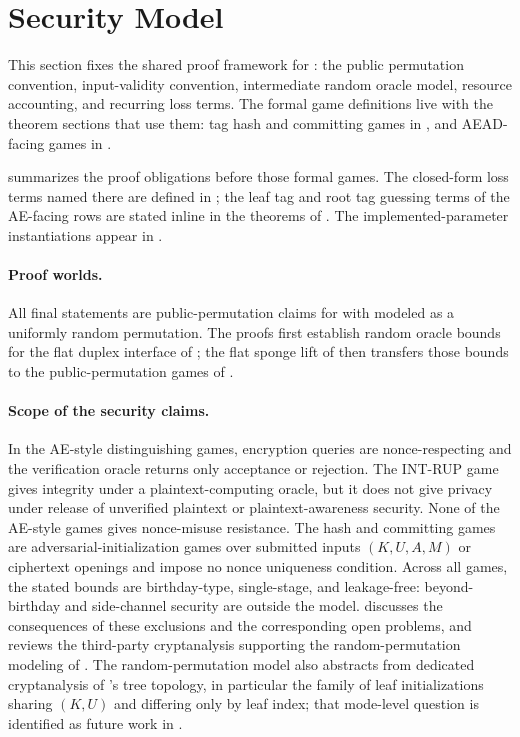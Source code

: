 \section{Security Model}
\label{sec:security-model}

This section fixes the shared proof framework for \TW{}: the public permutation
convention, input-validity convention, intermediate random oracle model,
resource accounting, and recurring loss terms. The formal game definitions live
with the theorem sections that use them: tag hash and committing games in
, and AEAD-facing games in
.

 summarizes the proof obligations before those
formal games. The closed-form loss terms named there are defined in
; the leaf tag and root tag guessing terms of the
AE-facing rows are stated inline in the theorems of .
The implemented-parameter instantiations appear in
.

\paragraph{Proof worlds.}
All final statements are public-permutation claims for \TW{} with \Keccakp{}
modeled as a uniformly random permutation. The proofs first establish random
oracle bounds for the flat duplex interface of ; the flat
sponge lift of  then transfers those bounds to the
public-permutation games of
.

\paragraph{Scope of the security claims.}
In the AE-style distinguishing games, encryption queries are nonce-respecting
and the verification oracle returns only acceptance or rejection. The
\textsf{INT-RUP} game gives integrity under a plaintext-computing oracle, but it
does not give privacy under release of unverified plaintext or
plaintext-awareness security. None of the AE-style games gives nonce-misuse
resistance. The hash and committing games are adversarial-initialization games
over submitted inputs $(K, U, A, M)$ or ciphertext openings and impose no nonce
uniqueness condition. Across all games, the stated bounds are birthday-type,
single-stage, and leakage-free: beyond-birthday and side-channel security are
outside the model.
 discusses the consequences of these exclusions and the
corresponding open problems, and  reviews
the third-party cryptanalysis supporting the random-permutation modeling of
\Keccakp{}. The random-permutation model also abstracts from dedicated
cryptanalysis of \TW{}'s tree topology, in particular the family of leaf
initializations sharing $(K,U)$ and differing only by leaf index; that
mode-level question is identified as future work in
.

